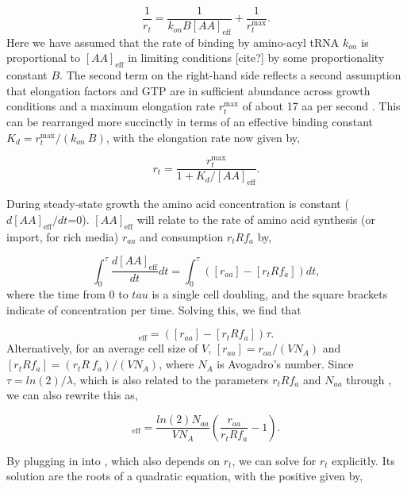 \begin{equation}
\frac{1}{r_t} = \frac{1}{k_{on} B [AA]_{\text{eff}}} + \frac{1}{r_{t}^{\text{max}}}.
\end{equation}
Here we have assumed that the rate of binding by amino-acyl tRNA $k_{on}$ is
proportional to $[AA]_{\text{eff}}$ in limiting conditions [cite?] by some
proportionality constant $B$. The second term on the right-hand side reflects a second
assumption that elongation factors and GTP are in sufficient abundance across
growth conditions and a maximum elongation rate $r_{t}^{\text{max}}$
of about 17 aa per second \cite{dai2016}. This can be rearranged more succinctly in
terms of an effective binding constant $K_d = r_{t}^{\text{max}}/ (k_{on} \ B)$, with
the elongation rate now given by,

\begin{equation}
r_t = \frac{r_{t}^{\text{max}}}{1 + K_d/[AA]_{\text{eff}}}.
\label{eq:rt_kd_simple}
\end{equation}

During steady-state
growth the amino acid concentration is constant ($d[AA]_{\text{eff}}/dt$=0). $[AA]_{\text{eff}}$
will relate to the
rate of amino acid synthesis (or import, for rich media)
$r_{aa}$ and consumption $r_t R f_a$ by,

\begin{equation}
\int_{0}^{\tau} \frac{d[AA]_{\text{eff}}}{dt} dt =  \int_{0}^{\tau} ([r_{aa}] - [r_t R f_a]) dt,
\end{equation}
where the time from 0 to $tau$ is a single cell doubling, and the square
brackets indicate of concentration per time. Solving this, we find that

\begin{equation}
[AA]_{\text{eff}} =  ([r_{aa}] - [r_t R f_a]) \tau.
\end{equation}
Alternatively, for an average cell size of $V$,  $[r_{aa}] = r_{aa}/(V N_A)$
and $[r_t R f_a] = (r_t R \ f_a)/(V N_A)$, where $N_A$ is Avogadro's
number. Since $\tau = ln(2)/\lambda$, which is also related to the parameters
$r_t R f_a$ and $N_{aa}$ through , we
can also rewrite this as,

\begin{equation}
[AA]_{\text{eff}} = \frac{ln(2) N_{aa}}{V N_A} \left(\frac{r_{aa}}{r_t R f_a} - 1 \right) .
\label{eq:aa_final}
\end{equation}


By plugging in  into , which also depends on $r_t$, we
can solve for $r_t$ explicitly. Its solution are the roots of a quadratic equation,
with the positive given by,


